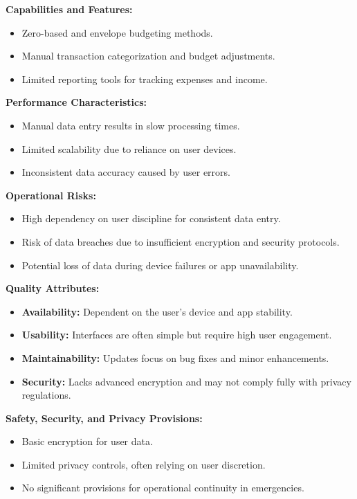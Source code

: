 \textbf{Capabilities and Features:}
\begin{itemize}
    \item Zero-based and envelope budgeting methods.
    \item Manual transaction categorization and budget adjustments.
    \item Limited reporting tools for tracking expenses and income.
\end{itemize}

\textbf{Performance Characteristics:}
\begin{itemize}
    \item Manual data entry results in slow processing times.
    \item Limited scalability due to reliance on user devices.
    \item Inconsistent data accuracy caused by user errors.
\end{itemize}

\textbf{Operational Risks:}
\begin{itemize}
    \item High dependency on user discipline for consistent data entry.
    \item Risk of data breaches due to insufficient encryption and security protocols.
    \item Potential loss of data during device failures or app unavailability.
\end{itemize}

\textbf{Quality Attributes:}
\begin{itemize}
    \item \textbf{Availability:} Dependent on the user’s device and app stability.
    \item \textbf{Usability:} Interfaces are often simple but require high user engagement.
    \item \textbf{Maintainability:} Updates focus on bug fixes and minor enhancements.
    \item \textbf{Security:} Lacks advanced encryption and may not comply fully with privacy regulations.
\end{itemize}

\textbf{Safety, Security, and Privacy Provisions:}
\begin{itemize}
    \item Basic encryption for user data.
    \item Limited privacy controls, often relying on user discretion.
    \item No significant provisions for operational continuity in emergencies.
\end{itemize}

